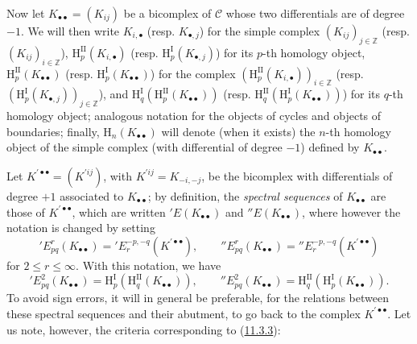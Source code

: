 \begin{env}[11.3.5]
\label{0.11.3.5}
Now let $K_{\bullet\bullet}=(K_{ij})$ be a bicomplex of
$\mathcal C$ whose two differentials are of degree $-1$. We
will then write $K_{i,\bullet}$ (resp. $K_{\bullet,j}$) for the simple complex
$(K_{ij})_{j\in\mathbb Z}$ (resp. $(K_{ij})_{i\in\mathbb Z}$),
$\mathrm H_p^{\mathrm{II}}(K_{i,\bullet})$ (resp.
$\mathrm H_p^{\mathrm I}(K_{\bullet,j})$) for its $p$-th homology object,
$\mathrm H_p^{\mathrm{II}}(K_{\bullet\bullet})$ (resp.
$\mathrm H_p^{\mathrm I}(K_{\bullet\bullet})$) for the complex
$(\mathrm H_p^{\mathrm{II}}(K_{i,\bullet}))_{i\in\mathbb Z}$ (resp.
$(\mathrm H_p^{\mathrm I}(K_{\bullet,j}))_{j\in\mathbb Z}$), and
$\mathrm H_q^{\mathrm I}(\mathrm H_p^{\mathrm{II}}(K_{\bullet\bullet}))$
(resp.
$\mathrm H_q^{\mathrm{II}}(\mathrm H_p^{\mathrm I}(K_{\bullet\bullet}))$)
for its $q$-th homology object; analogous notation for the objects of cycles
and objects of boundaries; finally, $\mathrm H_n(K_{\bullet\bullet})$ will denote
(when it exists) the $n$-th homology object of the simple complex (with
differential of degree $-1$) defined by $K_{\bullet\bullet}$.

Let $K^{\prime\bullet\bullet}=(K^{\prime ij})$, with
$K^{\prime ij}=K_{-i,-j}$, be the bicomplex with differentials of degree
$+1$ associated to $K_{\bullet\bullet}$; by definition, the
\emph{spectral sequences} of $K_{\bullet\bullet}$ are those of
$K^{\prime\bullet\bullet}$, which are written $'E(K_{\bullet\bullet})$ and
$''E(K_{\bullet\bullet})$, where however the notation is changed by
setting
\[
  'E_{pq}^r(K_{\bullet\bullet})
  ='E_r^{-p,-q}(K^{\prime\bullet\bullet}),\qquad
  ''E_{pq}^r(K_{\bullet\bullet})
  =''E_r^{-p,-q}(K^{\prime\bullet\bullet})
\]
for $2\leq r\leq\infty$. With this notation, we have
\[
  'E_{pq}^2(K_{\bullet\bullet})
  =\mathrm H_p^{\mathrm I}(\mathrm H_q^{\mathrm{II}}(K_{\bullet\bullet})),
  \qquad
  ''E_{pq}^2(K_{\bullet\bullet})
  =\mathrm H_q^{\mathrm{II}}(\mathrm H_p^{\mathrm I}(K_{\bullet\bullet})).
\]
To avoid sign errors, it will in general be preferable, for the
relations between these spectral sequences and their abutment, to go back to the
complex $K^{\prime\bullet\bullet}$. Let us note, however, the criteria
corresponding to (\hyperref[0.11.3.3]{11.3.3}):
\end{env}

